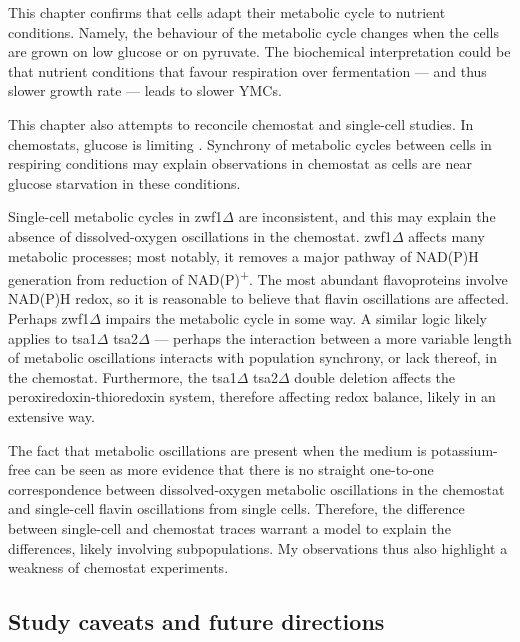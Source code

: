 This chapter confirms that cells adapt their metabolic cycle to nutrient conditions.
Namely, the behaviour of the metabolic cycle changes when the cells are grown on low glucose or on pyruvate.
The biochemical interpretation could be that nutrient conditions that favour respiration over fermentation --- and thus slower growth rate --- leads to slower YMCs.

This chapter also attempts to reconcile chemostat and single-cell studies.
In chemostats, glucose is limiting \parencite{jonesCyberneticModelGrowth1999}.
Synchrony of metabolic cycles between cells in respiring conditions may explain observations in chemostat as cells are near glucose starvation in these conditions.

Single-cell metabolic cycles in zwf1$\Delta$ are inconsistent, and this may explain the absence of dissolved-oxygen oscillations in the chemostat.
zwf1$\Delta$ affects many metabolic processes; most notably, it removes a major pathway of NAD(P)H generation from reduction of NAD(P)\textsuperscript{+}.
The most abundant flavoproteins involve NAD(P)H redox, so it is reasonable to believe that flavin oscillations are affected.
Perhaps zwf1$\Delta$ impairs the metabolic cycle in some way.
A similar logic likely applies to tsa1$\Delta$ tsa2$\Delta$ --- perhaps the interaction between a more variable length of metabolic oscillations interacts with population synchrony, or lack thereof, in the chemostat.
Furthermore, the tsa1$\Delta$ tsa2$\Delta$ double deletion affects the peroxiredoxin-thioredoxin system, therefore affecting redox balance, likely in an extensive way.

The fact that metabolic oscillations are present when the medium is potassium-free can be seen as more evidence that there is no straight one-to-one correspondence between dissolved-oxygen metabolic oscillations in the chemostat and single-cell flavin oscillations from single cells.
Therefore, the difference between single-cell and chemostat traces warrant a model to explain the differences, likely involving subpopulations.
My observations thus also highlight a weakness of chemostat experiments.


\subsection{Study caveats and future directions}
\label{subsec:biology-discussion-caveats}

